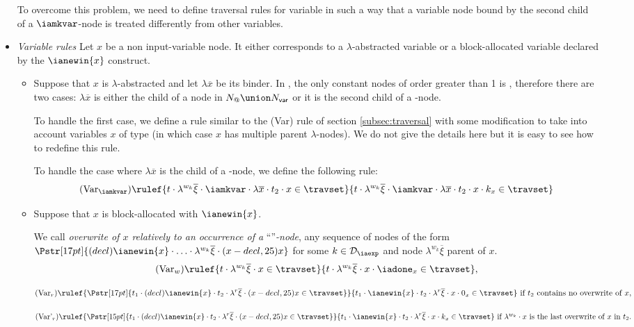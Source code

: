 \begin{itemize}
To overcome this problem, we need to define traversal rules for
variable in such a way that a variable node bound by the second
child of a $\iamkvar$-node is treated differently from other
variables.

\item \emph{Variable rules}
Let $x$ be a non input-variable node. It either corresponds to a $\lambda$-abstracted variable or
a block-allocated variable declared by the $\ianewin{x}$ construct.

\begin{itemize}
\item Suppose that $x$ is $\lambda$-abstracted and let $\lambda \overline{x}$ be its binder.
In \ialgol, the only constant nodes of order greater than 1 is
\iamkvar, therefore there are two cases: $\lambda \overline{x}$ is
either the child of a node in $N_@ \union N_{\sf var}$ or it is the
second child of a \iamkvar-node.

To handle the first case, we define a rule similar to the (Var) rule
of section \ref{subsec:traversal} with some modification to take
into account variables $x$ of type \iavar (in which case $x$ has
multiple parent $\lambda$-nodes). We do not give the details here
but it is easy to see how to redefine this rule.

To handle the case where $\lambda \overline{x}$ is the child of a
\iamkvar-node, we define the following rule:
$$ (\mbox{Var}_{\iamkvar})  \rulef{t \cdot \lambda^{w_k} \overline{\xi} \cdot \iamkvar \cdot \lambda \overline{x} \cdot t_2 \cdot x \in \travset}
{t \cdot \lambda^{w_k} \overline{\xi} \cdot \iamkvar \cdot \lambda
\overline{x} \cdot t_2 \cdot x \cdot k_{x} \in \travset }
$$

\item Suppose that $x$ is block-allocated with $\ianewin{x}$.

We call \emph{overwrite of $x$ relatively to an occurrence of a} ``''\emph{-node}, any sequence of nodes of the form
$\Pstr[17pt]{(decl){\ianewin{x}}\cdot \ldots \cdot \lambda^{w_k}\overline{\xi} \cdot (x-decl,25){x}}$ for some $k\in \mathcal{D}_{\iaexp}$ and node $\lambda^{w_k}\overline{\xi}$ parent
of $x$.
$$(\mbox{Var}_w)
    \rulef{
        t \cdot \lambda^{w_k} \overline{\xi} \cdot x \in \travset
    }
    {   t \cdot \lambda^{w_k} \overline{\xi} \cdot x \cdot \iadone_x \in
        \travset
    },
$$

$$(\mbox{Var}_r)
    \rulef{
        \Pstr[17pt]{t_1 \cdot (decl){\ianewin{x}} \cdot t_2 \cdot \lambda^r \overline{\xi} \cdot (x-decl,25){x} \in \travset}
    }
    {   t_1 \cdot \ianewin{x} \cdot t_2 \cdot \lambda^r \overline{\xi}
        \cdot x \cdot 0_x \in \travset
    }
    \mbox{ if $t_2$ contains no overwrite of $x$},
$$

$$(\mbox{Var'}_r)
    \rulef{
        \Pstr[15pt]{
            t_1 \cdot (decl){\ianewin{x}} \cdot t_2 \cdot \lambda^r \overline{\xi} \cdot (x-decl,25){x} \in \travset
        }
    }
    {
        t_1 \cdot \ianewin{x} \cdot t_2 \cdot \lambda^r \overline{\xi} \cdot x \cdot k_x \in \travset
    }
    \mbox{ if $\lambda^{w_k} \cdot x$ is the last overwrite of $x$ in } t_2. $$
\end{itemize}
\end{itemize}

